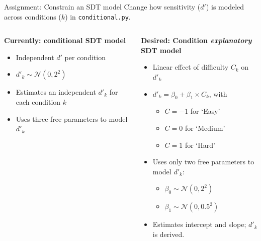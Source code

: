 \documentclass[aspectratio=169]{beamer}
\begin{document}
\begin{frame}[fragile]{Assignment: Constrain an SDT model}
    Change how sensitivity ($d'$) is modeled across conditions ($k$) in \texttt{conditional.py}.

    \begin{columns}[T] %
        \begin{column}{0.45\textwidth}
            \textbf{Currently: conditional SDT model} \\
            \begin{itemize}
                \item Independent $d'$ per condition
                \item $d'_{k} \sim \mathcal{N}(0, 2^2)$
                \item Estimates an independent $d'_k$ for each condition $k$
                \item Uses three free parameters to model $d'_k$
            \end{itemize}
        \end{column}

        \begin{column}{0.6\textwidth}
            \textbf{Desired: Condition \emph{explanatory} SDT model} \\
            \begin{itemize}
                \item Linear effect of difficulty $C_k$ on $d'_k$
                \item $d'_k = \beta_0 + \beta_1 \times C_k$, with
                \begin{itemize}
                \item $C=-1$ for `Easy'
                \item $C=0$ for `Medium'
                \item $C=1$ for `Hard'
                \end{itemize}
                \item Uses only two free parameters to model $d'_k$:
                \begin{itemize}
                    \item $\beta_0 \sim \mathcal{N}(0, 2^2)$
                    \item $\beta_1 \sim \mathcal{N}(0, 0.5^2)$
                \end{itemize}
                \item Estimates intercept and slope; $d'_k$ is derived.
            \end{itemize}
        \end{column}
    \end{columns}
\end{frame}
\end{document}
